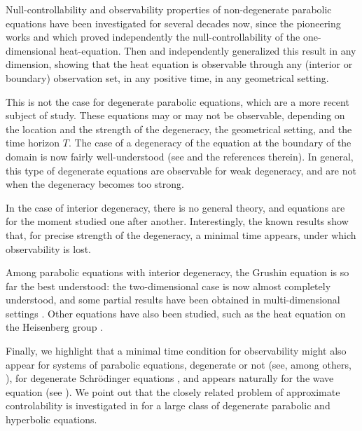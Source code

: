 \documentclass[11pt]{article}
\numberwithin{equation}{section}
\theoremstyle{plain}
\theoremstyle{definition}
\newcommand{\1}{\mathds 1}
\begin{document}
Null-controllability and observability properties of non-degenerate parabolic equations have been investigated
for several decades now, since the pioneering works \cite{egorov} and \cite{fattorini_russel} which proved independently the null-controllability of the one-dimensional heat-equation. Then \cite{Lebeau_Robbiano}
and \cite{Fursikov_Imanuvilov} independently generalized this result in any dimension, showing
that the heat equation is observable through any (interior or boundary) observation set, in any positive time, in any
geometrical setting.

This is not the case for degenerate parabolic equations, which are a more recent subject of study. These equations
may or may not be observable, depending on the location and the strength of the degeneracy, the geometrical setting, and the time horizon $T$.
The case of a degeneracy of the equation at the boundary of the domain
is now fairly well-understood (see \cite{Cannarsa_Martinez_Vancostenoble} and the references therein). In general, this type of degenerate equations are observable for weak degeneracy, and are not when the degeneracy becomes too strong.

In the case of interior
degeneracy, there is no general theory, and equations are for the moment studied one after another.
Interestingly, the known results show that, for precise strength of the degeneracy, a minimal time
appears, under which observability is lost.

Among parabolic equations with interior degeneracy, the Grushin equation is so far the best understood: the two-dimensional case is now
almost completely understood, and some partial results have been obtained in multi-dimensional settings \cite{Beauchard_Cannarsa_Guglielmi,Beauchard_Miller_Morancey,Koenig17,Lissy19,Beauchard_Darde_Ervedoza,Duprez_Koenig,Allonsius_Boyer_Morancey}. Other equations have also been studied, such as the heat equation on the Heisenberg group \cite{Beauchard_Cannarsa}.

Finally, we highlight that a minimal time condition for observability might also appear for systems of parabolic equations, degenerate or not (see, among others, \cite{AmmarKhodja_Benabdallah_GonzalesBurgos_deTeresa,Duprez,Benabdallah_Boyer_Morancey}),
for degenerate Schrödinger equations \cite{Burq_Sun_19,LetrouitSun20}, and appears naturally for the wave equation (see \cite{raucht74,bardoslr92}). We point out that the closely related problem of approximate controlability
is investigated in \cite{LaurentLeautaud18} for a large class of degenerate parabolic and hyperbolic equations.
\end{document}
